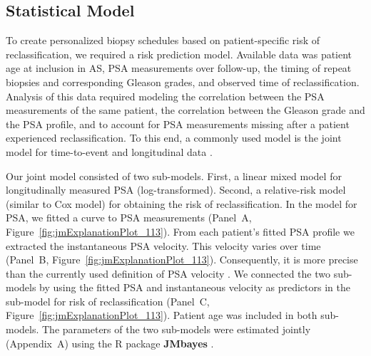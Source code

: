 \subsection{Statistical Model}
To create personalized biopsy schedules based on patient-specific risk of reclassification, we required a risk prediction model. Available data was patient age at inclusion in AS, PSA measurements over follow-up, the timing of repeat biopsies and corresponding Gleason grades, and observed time of reclassification. Analysis of this data required modeling the correlation between the PSA measurements of the same patient, the correlation between the Gleason grade and the PSA profile, and to account for PSA measurements missing after a patient experienced reclassification. To this end, a commonly used model is the joint model for time-to-event and longitudinal data \citep{tomer2019,coley2017prediction,rizopoulos2012joint}.

Our joint model consisted of two sub-models. First, a linear mixed model \citep{laird1982random} for longitudinally measured PSA (log-transformed). Second, a relative-risk model (similar to Cox model) for obtaining the risk of reclassification. In the model for PSA, we fitted a curve to PSA measurements (Panel~A, Figure~\ref{fig:jmExplanationPlot_113}). From each patient's fitted PSA profile we extracted the instantaneous PSA velocity. This velocity varies over time (Panel~B, Figure~\ref{fig:jmExplanationPlot_113}). Consequently, it is more precise than the currently used definition of PSA velocity \citep{vickers2009psavelocity}. We connected the two sub-models by using the fitted PSA and instantaneous velocity as predictors in the sub-model for risk of reclassification (Panel~C, Figure~\ref{fig:jmExplanationPlot_113}). Patient age was included in both sub-models. The parameters of the two sub-models were estimated jointly (Appendix~A) using the R package \textbf{JMbayes} \citep{rizopoulosJMbayes}. 

